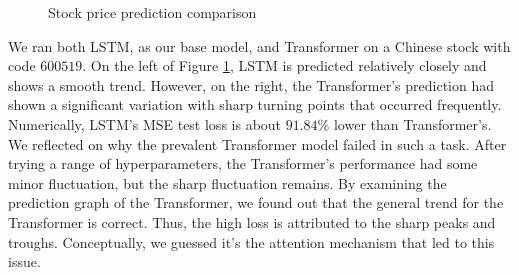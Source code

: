 \documentclass[stu,12pt,floatsintext]{apa7}
\begin{document}
\begin{figure}[H]
    \centering
    \hfill
    \caption{Stock price prediction comparison}
    \label{fig:stock-predict-compare}
\end{figure}

We ran both LSTM, as our base model, and Transformer on a Chinese stock with code $600519$. On the left of Figure \ref{fig:stock-predict-compare}, LSTM is predicted relatively closely and shows a smooth trend. However, on the right, the Transformer's prediction had shown a significant variation with sharp turning points that occurred frequently. Numerically, LSTM's MSE test loss is about $91.84\%$ lower than Transformer's. We reflected on why the prevalent Transformer model failed in such a task. After trying a range of hyperparameters, the Transformer's performance had some minor fluctuation, but the sharp fluctuation remains. By examining the prediction graph of the Transformer, we found out that the general trend for the Transformer is correct. Thus, the high loss is attributed to the sharp peaks and troughs. Conceptually, we guessed it's the attention mechanism that led to this issue. 
\end{document}
